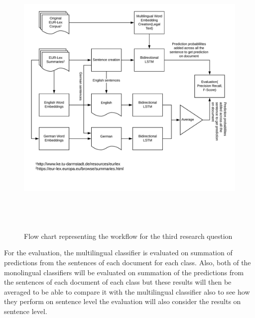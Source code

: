 \begin{figure}[!ht]
    \centering
    \includegraphics[width=15cm, height=14cm,keepaspectratio]{pics/flowforQuestion3.jpeg}
    \caption{Flow chart representing the workflow for the third research question}
    \label{fig:FlowResearchQuestion3}
\end{figure}

For the evaluation, the multilingual classifier is evaluated on summation of predictions from the sentences of each document for each class. Also, both of the monolingual classifiers will be evaluated on summation of the predictions from the sentences of each document of each class but these results will then be averaged to be able to compare it with the multilingual classifier also to see how they perform on sentence level the evaluation will also consider the results on sentence level.

